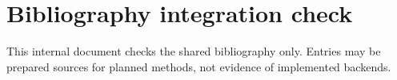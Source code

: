 \documentclass[a4paper,fleqn]{cas-sc}
\begin{document}
\section*{Bibliography integration check}
This internal document checks the shared bibliography only. Entries may be
prepared sources for planned methods, not evidence of implemented backends.
\nocite{*}
\sloppy
\raggedright


\end{document}
